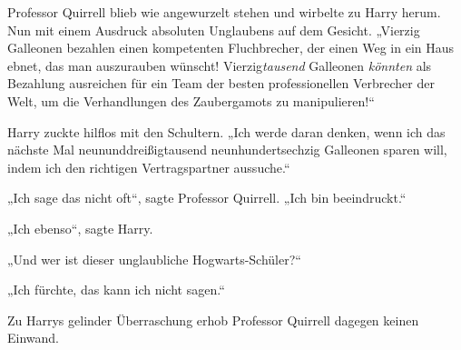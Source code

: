 Professor Quirrell blieb wie angewurzelt stehen und wirbelte zu Harry herum. Nun mit einem Ausdruck absoluten Unglaubens auf dem Gesicht.
„Vierzig Galleonen bezahlen einen kompetenten Fluchbrecher, der einen Weg in ein Haus ebnet, das man auszurauben wünscht! Vierzig{}\emph{tausend} Galleonen \emph{könnten} als Bezahlung ausreichen für ein Team der besten professionellen Verbrecher der Welt, um die Verhandlungen des Zaubergamots zu manipulieren!“%

Harry zuckte hilflos mit den Schultern.
„Ich werde daran denken, wenn ich das nächste Mal neununddreißigtausend neunhundertsechzig Galleonen sparen will, indem ich den richtigen Vertragspartner aussuche.“

„Ich sage das nicht oft“, sagte Professor Quirrell.
„Ich bin beeindruckt.“

„Ich ebenso“, sagte Harry.

„Und wer ist dieser unglaubliche Hogwarts-Schüler?“

„Ich fürchte, das kann ich nicht sagen.“

Zu Harrys gelinder Überraschung erhob Professor Quirrell dagegen keinen Einwand.

